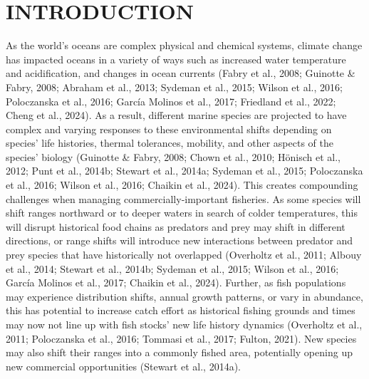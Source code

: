 \documentclass[
  12pt,
]{article}
\begin{document}
\section{INTRODUCTION}\label{introduction}

As the world's oceans are complex physical and chemical systems, climate change has impacted oceans in a variety of ways such as increased water temperature and acidification, and changes in ocean currents (Fabry et al., 2008; Guinotte \& Fabry, 2008; Abraham et al., 2013; Sydeman et al., 2015; Wilson et al., 2016; Poloczanska et al., 2016; García Molinos et al., 2017; Friedland et al., 2022; Cheng et al., 2024). As a result, different marine species are projected to have complex and varying responses to these environmental shifts depending on species' life histories, thermal tolerances, mobility, and other aspects of the species' biology (Guinotte \& Fabry, 2008; Chown et al., 2010; Hönisch et al., 2012; Punt et al., 2014b; Stewart et al., 2014a; Sydeman et al., 2015; Poloczanska et al., 2016; Wilson et al., 2016; Chaikin et al., 2024). This creates compounding challenges when managing commercially-important fisheries. As some species will shift ranges northward or to deeper waters in search of colder temperatures, this will disrupt historical food chains as predators and prey may shift in different directions, or range shifts will introduce new interactions between predator and prey species that have historically not overlapped (Overholtz et al., 2011; Albouy et al., 2014; Stewart et al., 2014b; Sydeman et al., 2015; Wilson et al., 2016; García Molinos et al., 2017; Chaikin et al., 2024). Further, as fish populations may experience distribution shifts, annual growth patterns, or vary in abundance, this has potential to increase catch effort as historical fishing grounds and times may now not line up with fish stocks' new life history dynamics (Overholtz et al., 2011; Poloczanska et al., 2016; Tommasi et al., 2017; Fulton, 2021). New species may also shift their ranges into a commonly fished area, potentially opening up new commercial opportunities (Stewart et al., 2014a).
\end{document}
